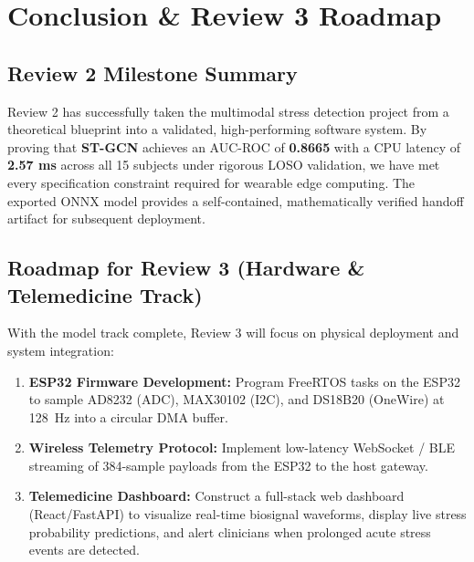 \documentclass[conference]{IEEEtran}
\begin{document}
\section{Conclusion \& Review 3 Roadmap}

\subsection{Review 2 Milestone Summary}
Review 2 has successfully taken the multimodal stress detection project from a theoretical blueprint into a validated, high-performing software system. By proving that \textbf{ST-GCN} achieves an AUC-ROC of \textbf{0.8665} with a CPU latency of \textbf{2.57 ms} across all 15 subjects under rigorous LOSO validation, we have met every specification constraint required for wearable edge computing. The exported ONNX model provides a self-contained, mathematically verified handoff artifact for subsequent deployment.

\subsection{Roadmap for Review 3 (Hardware \& Telemedicine Track)}
With the model track complete, Review 3 will focus on physical deployment and system integration:
\begin{enumerate}
    \item \textbf{ESP32 Firmware Development:} Program FreeRTOS tasks on the ESP32 to sample AD8232 (ADC), MAX30102 (I2C), and DS18B20 (OneWire) at 128~Hz into a circular DMA buffer.
    \item \textbf{Wireless Telemetry Protocol:} Implement low-latency WebSocket / BLE streaming of 384-sample payloads from the ESP32 to the host gateway.
    \item \textbf{Telemedicine Dashboard:} Construct a full-stack web dashboard (React/FastAPI) to visualize real-time biosignal waveforms, display live stress probability predictions, and alert clinicians when prolonged acute stress events are detected.
\end{enumerate}
\end{document}
